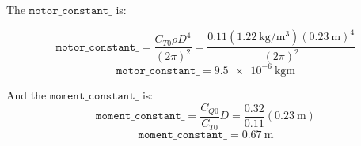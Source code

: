 \documentclass[12pt]{article}
\begin{document}
The $\mathtt{motor\_constant\_}$ is:

\begin{equation}
\mathtt{motor\_constant\_} = \frac{C_{T0} \rho D^4}{(2 \pi)^2} = \frac{0.11 (\SI{1.22}{\kilogram\per\meter\cubed}) (\SI{0.23}{\meter})^4}{(2 \pi)^2}
\end{equation}
\begin{equation}
\mathtt{motor\_constant\_} = \SI{9.5e-6}{\kilogram\meter}
\end{equation}

And the $\mathtt{moment\_constant\_}$ is:
\begin{equation}
\mathtt{moment\_constant\_} = \frac{C_{Q0}}{C_{T0}} D = \frac{0.32}{0.11} (\SI{0.23}{\meter})
\end{equation}
\begin{equation}
\mathtt{moment\_constant\_} = \SI{0.67}{\meter}
\end{equation}

\printbibliography
\end{document}

